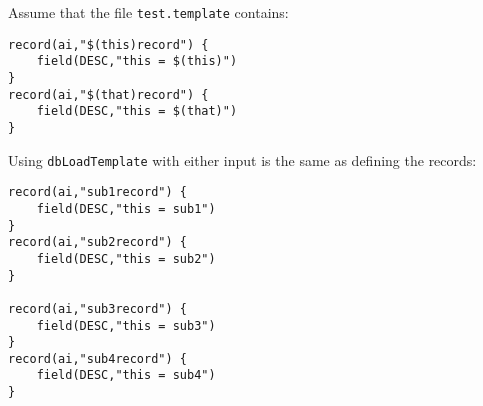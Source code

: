 Assume that the file \verb|test.template| contains:

\begin{verbatim}
record(ai,"$(this)record") {
    field(DESC,"this = $(this)")
}
record(ai,"$(that)record") {
    field(DESC,"this = $(that)")
}
\end{verbatim}

Using \verb|dbLoadTemplate| with either input is the same as defining the records:

\begin{verbatim}
record(ai,"sub1record") {
    field(DESC,"this = sub1")
}
record(ai,"sub2record") {
    field(DESC,"this = sub2")
}

record(ai,"sub3record") {
    field(DESC,"this = sub3")
}
record(ai,"sub4record") {
    field(DESC,"this = sub4")
}
\end{verbatim}
